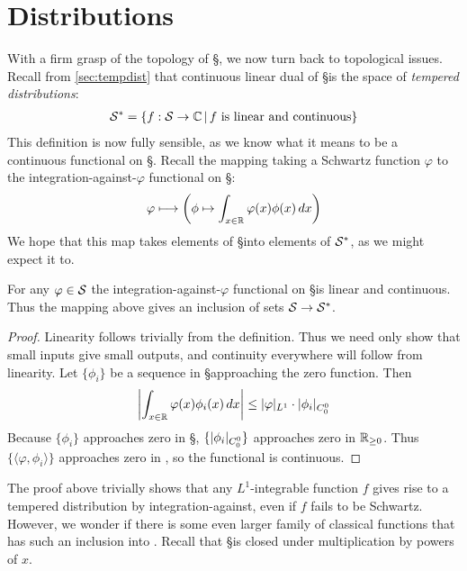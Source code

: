 
  \setcounter{chapter}{2}
  \setcounter{thm}{0}
  \chapter{Distributions}
  \label{ch:dists}
  
  With a firm grasp of the topology of \S, we now turn back to topological issues.
  Recall from \cref{sec:tempdist} that continuous linear dual of \S is the space of \emph{tempered distributions}:
  \begin{align*}
    \S^* = \{f:\S\rightarrow\C\,\vert\,f\text{ is linear and continuous}\}
  \end{align*}
  This definition is now fully sensible, as we know what it means to be a continuous functional on \S.
  Recall the mapping taking a Schwartz function $\varphi$ to the integration-against-$\varphi$ functional on \S:
  \begin{align*}
    \varphi \longmapsto \left( \phi \mapsto \int_{x\in\R} \varphi(x) \phi(x)\,dx \right)
  \end{align*}
  We hope that this map takes elements of \S into elements of $\S^*$, as we might expect it to.
  \begin{thm}
    \label{thm:intagainstiscont}
    For any $\varphi\in\S$ the integration-against-$\varphi$ functional on \S is linear and continuous.
    Thus the mapping above gives an inclusion of sets $\S\rightarrow\S^*$.
  \end{thm}
  \begin{proof}
    Linearity follows trivially from the definition.
    Thus we need only show that small inputs give small outputs, and continuity everywhere will follow from linearity.
    Let $\{\phi_i\}$ be a sequence in \S approaching the zero function.
    Then
    \begin{align*}
      \left|\int_{x\in\R} \varphi(x)\phi_i(x)\,dx\right|
      \le |\varphi|_{L^1}\cdot |\phi_i|_\Coo
    \end{align*}
    Because $\{\phi_i\}$ approaches zero in \S, $\{|\phi_i|_\Coo\}$ approaches zero in $\R_{\ge0}$.
    Thus $\{\langle \varphi,\phi_i\rangle\}$ approaches zero in \C, so the functional is continuous.
  \end{proof}
  The proof above trivially shows that any $L^1$-integrable function $f$ gives rise to a tempered distribution by integration-against, even if $f$ fails to be Schwartz.
  However, we wonder if there is some even larger family of classical functions that has such an inclusion into \SS.
  Recall that \S is closed under multiplication by powers of $x$.
